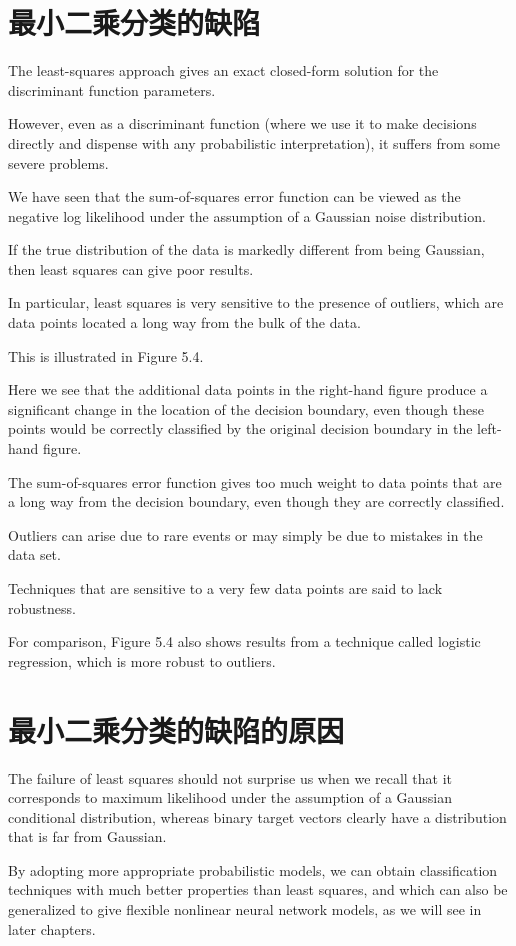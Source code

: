 \documentclass{article}
\begin{document}
\section{最小二乘分类的缺陷}

The least-squares approach gives an exact closed-form solution for the discriminant function parameters. 

However, even as a discriminant function (where we use it to make decisions directly and dispense with any probabilistic interpretation), it suffers from some severe problems. 

We have seen that the sum-of-squares error function can be viewed as the negative log likelihood under the assumption of a Gaussian noise distribution. 

If the true distribution of the data is markedly different from being Gaussian, then least squares can give poor results. 

In particular, least squares is very sensitive to the presence of outliers, which are data points located a long way from the bulk of the data. 

This is illustrated in Figure 5.4. 

Here we see that the additional data points in the right-hand figure produce a significant change in the location of the decision boundary, even though these points would be correctly classified by the original decision boundary in the left-hand figure. 

The sum-of-squares error function gives too much weight to data points that are a long way from the decision boundary, even though they are correctly classified. 

Outliers can arise due to rare events or may simply be due to mistakes in the data set. 

Techniques that are sensitive to a very few data points are said to lack robustness. 

For comparison, Figure 5.4 also shows results from a technique called logistic regression, which is more robust to outliers.

\section{最小二乘分类的缺陷的原因}

The failure of least squares should not surprise us when we recall that it corresponds to maximum likelihood under the assumption of a Gaussian conditional distribution, whereas binary target vectors clearly have a distribution that is far from Gaussian. 

By adopting more appropriate probabilistic models, we can obtain classification techniques with much better properties than least squares, and which can also be generalized to give flexible nonlinear neural network models, as we will see in later chapters.
\end{document}
